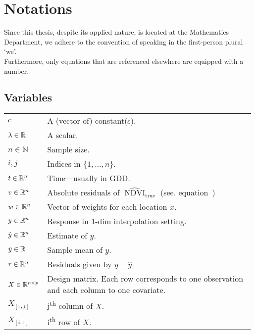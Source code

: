 \chapter*{ Notations}
\label{c:Notation}
Since this thesis, despite its applied nature, is located at the Mathematics Department, we adhere to the convention of speaking in the first-person plural `we'.\\
Furthermore, only equations that are referenced elsewhere are equipped with a number.

\section*{Variables}\vspace{-0.2cm}
\renewcommand{\arraystretch}{1.3} %
\begin{longtable}{p{0.12\linewidth} p{0.87\linewidth}}
$c$		& A (vector of) constant(s).\\
$\lambda \in \mathbb{R}$		& A scalar.\\
$n\in \mathbb{N}$		& Sample size.\\
$i,j$		& Indices in $\{1,\dots,n\}$.\\
$t\in \mathbb{R}^n$		& Time---usually in GDD.\\
$v\in \mathbb{R}^n$ & Absolute residuals of $\widehat{\operatorname{NDVI}}_\text{true}$ (see. equation~{eq:absndvires})\\
$w \in \mathbb{R}^n$		& Vector of weights for each location $x$.\\
$y\in \mathbb{R}^n$		& Response in 1-dim interpolation setting.\\
$\hat y\in \mathbb{R}^n$		& Estimate of $y$.\\
$\bar y\in \mathbb{R}$		& Sample mean of $y$.\\
$r \in \mathbb{R}^n$		& Residuals given by $y - \hat y$.\\
$X\in\mathbb{R}^{n\times p}$ & Design matrix. Each row corresponds to one observation and each column to one covariate.\\
$X_{[:,j]}$ 	& j\textsuperscript{th} column of $X$.\\
$X_{[i,:]}$ 	& i\textsuperscript{th} row of $X$.
\end{longtable}

